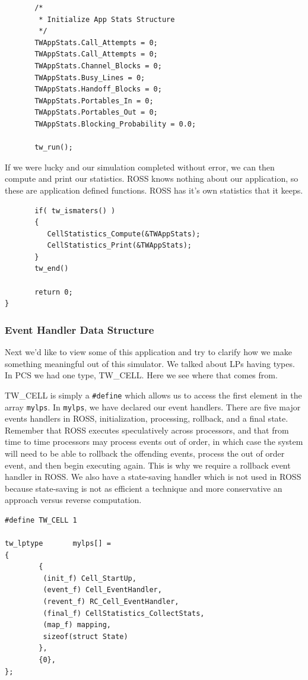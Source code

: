 \documentclass[12pt]{article}
\begin{document}
\begin{verbatim}
       /*
        * Initialize App Stats Structure
        */
       TWAppStats.Call_Attempts = 0;
       TWAppStats.Call_Attempts = 0;
       TWAppStats.Channel_Blocks = 0;
       TWAppStats.Busy_Lines = 0;
       TWAppStats.Handoff_Blocks = 0;
       TWAppStats.Portables_In = 0;
       TWAppStats.Portables_Out = 0;
       TWAppStats.Blocking_Probability = 0.0;

       tw_run();
\end{verbatim}
      
If we were lucky and our simulation completed without error, we can then
compute and print our statistics.  ROSS knows nothing about our application,
so these are application defined functions.  ROSS has it's own statistics that
it keeps.

\begin{verbatim}
       if( tw_ismaters() )
       {
          CellStatistics_Compute(&TWAppStats);
          CellStatistics_Print(&TWAppStats);
       }
       tw_end()

       return 0;
}
\end{verbatim}
 
\subsubsection{Event Handler Data Structure}
Next we'd like to view some of this application and try to clarify how we make
something meaningful out of this simulator.  We talked about LPs having types.
In PCS we had one type, TW\_CELL.  Here we see where that comes from.

TW\_CELL is simply a {\tt \#define} which allows us to access the first
element in the array {\tt mylps}.  In {\tt mylps}, we have declared our event
handlers.  There are five major events handlers in ROSS, initialization,
processing, rollback, and a final state.  Remember that ROSS executes
speculatively across processors, and that from time to time processors may
process events out of order, in which case the system will need to be able to
rollback the offending events, process the out of order event, and then begin
executing again.  This is why we require a rollback event handler in ROSS.  We
also have a state-saving handler which is not used in ROSS because
state-saving is not as efficient a technique and more conservative an approach
versus reverse computation.

\begin{verbatim}
#define TW_CELL 1

tw_lptype       mylps[] =
{
        {
         (init_f) Cell_StartUp,
         (event_f) Cell_EventHandler,
         (revent_f) RC_Cell_EventHandler,
         (final_f) CellStatistics_CollectStats,
         (map_f) mapping,
         sizeof(struct State)
        },
        {0},
};

\end{verbatim}
\end{document}
